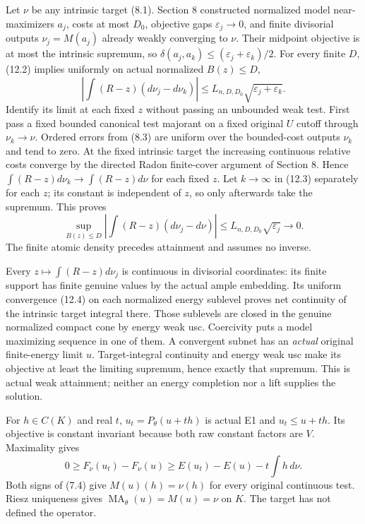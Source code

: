 \documentclass[10pt]{article}
\newcommand{\MA}{\operatorname{MA}}
\begin{document}
Let $\nu$ be any intrinsic target (8.1). Section 8 constructed normalized
model near-maximizers $a_j$, costs at most $D_0$, objective gaps
$\varepsilon_j\to0$, and finite divisorial outputs $\nu_j=M(a_j)$
already weakly converging to $\nu$. Their midpoint objective is at most
the intrinsic supremum, so
$\delta(a_j,a_k)\leq(\varepsilon_j+\varepsilon_k)/2$.
For every finite $D$, (12.2) implies uniformly on actual normalized
$B(z)\leq D$,
\[
 |\int(R-z)(d\nu_j-d\nu_k)|
 \leq L_{n,D,D_0}\sqrt{\varepsilon_j+\varepsilon_k}.
 \tag{12.3}
\]
Identify its limit at each fixed $z$ without passing an unbounded weak
test. First pass a fixed bounded canonical test majorant on a fixed
original $U$ cutoff through $\nu_k\to\nu$. Ordered errors from (8.3)
are uniform over the bounded-cost outputs $\nu_k$ and tend to zero.
At the fixed intrinsic target the increasing continuous relative costs
converge by the directed Radon finite-cover argument of Section 8.
Hence $\int(R-z)d\nu_k\to\int(R-z)d\nu$ for each fixed $z$.
Let $k\to\infty$ in (12.3) separately for each $z$; its constant is
independent of $z$, so only afterwards take the supremum. This proves
\[
 \sup_{B(z)\leq D}|\int(R-z)(d\nu_j-d\nu)|
       \leq L_{n,D,D_0}\sqrt{\varepsilon_j}\longrightarrow0.
 \tag{12.4}
\]
The finite atomic density precedes attainment and assumes no inverse.

Every $z\mapsto\int(R-z)d\nu_j$ is continuous in divisorial coordinates:
its finite support has finite genuine values by the actual ample embedding.
Its uniform convergence (12.4) on each normalized energy sublevel proves
net continuity of the intrinsic target integral there. Those sublevels
are closed in the genuine normalized compact cone by energy weak usc.
Coercivity puts a model maximizing sequence in one of them. A convergent
subnet has an \emph{actual} original finite-energy limit $u$.
Target-integral continuity and energy weak usc make its objective at least
the limiting supremum, hence exactly that supremum. This is actual weak
attainment; neither an energy completion nor a lift supplies the solution.

For $h\in C(K)$ and real $t$, $u_t=P_\theta(u+th)$ is actual E1 and
$u_t\leq u+th$. Its objective is constant invariant because both raw
constant factors are $V$. Maximality gives
\[
 0\geq F_\nu(u_t)-F_\nu(u)
 \geq E(u_t)-E(u)-t\int h\,d\nu.
 \tag{12.5}
\]
Both signs of (7.4) give $M(u)(h)=\nu(h)$ for every original continuous
test. Riesz uniqueness gives $\MA_\theta(u)=M(u)=\nu$ on $K$.
The target has not defined the operator.
\end{document}
